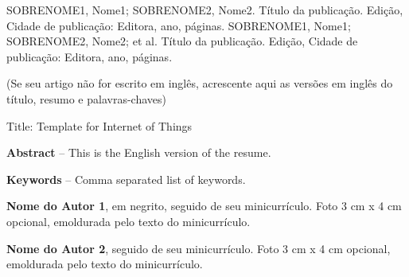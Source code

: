 \documentclass[
	article,			%
	12pt,				%
	oneside,			%
	a4paper,			%
	english,			%
	brazil,				%
	sumario=tradicional
	]{abntex2}
\begin{document}
SOBRENOME1, Nome1;  SOBRENOME2, Nome2.  Título da publicação.  Edição, Cidade de publicação: Editora, ano, páginas.
SOBRENOME1, Nome1;  SOBRENOME2, Nome2; et al.  Título da publicação.  Edição, Cidade de publicação: Editora, ano, páginas.

(Se seu artigo não for escrito em inglês, acrescente aqui as versões em inglês do título, resumo e palavras-chaves)

\begin{changemargin}{1cm}{1cm} 

Title: Template for Internet of Things

\textbf{Abstract} – This is the English version of the resume.

\textbf{Keywords} – Comma separated list of keywords.

\end{changemargin}


\textbf{Nome do Autor 1}, em negrito, seguido de seu minicurrículo. Foto 3 cm x 4 cm opcional, emoldurada pelo texto do minicurrículo.


\textbf{Nome do Autor 2}, seguido de seu minicurrículo. Foto 3 cm x 4 cm opcional, emoldurada pelo texto do minicurrículo.
\end{document}
